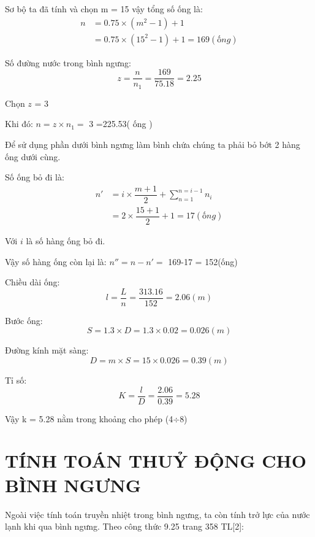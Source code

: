Sơ bộ ta đã tính và chọn m = 15 vậy tổng số ống là:
\begin{equation*}
	\begin{split}
		n &= 0.75\times (m^2 - 1) + 1\\
		&=0.75 \times (15^2-1)+1 = 169(ống)
	\end{split}
\end{equation*}

Số đường nước trong bình ngưng:
\begin{equation*}
	z = \dfrac{n}{n_{1}} = \dfrac{169}{75.18} = 2.25 
\end{equation*}

Chọn $z$ = 3

Khi đó: $n = z\times n_{1} = $ 3 =225.53( ống ) 



Để sử dụng phần dưới bình ngưng làm bình chứa chúng ta phải bỏ bớt 2 hàng ống dưới cùng.

Số ống bỏ đi là:
\begin{equation*}
	\begin{split}
		n' &= i\times \dfrac{m + 1}{2} + \sum_{n=1}^{n=i-1}n_{i}\\
		&=  2 \times \dfrac{15+1}{2}+1 = 17(ống)
	\end{split}
\end{equation*}

Với $i$ là số hàng ống bỏ đi.

Vậy số hàng ống còn lại là: $n'' = n - n' = $ 169-17 = 152(ống)

Chiều dài ống:
\begin{equation*}
	l = \dfrac{L}{n} = \dfrac{313.16}{152}= 2.06(m)
\end{equation*}

Bước ống:
\begin{equation*}
	S = 1.3\times D = 1.3 \times 0.02 = 0.026(m)
\end{equation*}

Đường kính mặt sàng:
\begin{equation*}
	D = m\times S = 15 \times 0.026 = 0.39(m)
\end{equation*}

Tỉ số:
\begin{equation*}
	K = \dfrac{l}{D} =\dfrac{2.06}{0.39}=5.28
\end{equation*}

Vậy k = 5.28 nằm trong khoảng cho phép (4$\div$8)

\section{TÍNH TOÁN THUỶ ĐỘNG CHO BÌNH NGƯNG}
Ngoài việc tính toán truyền nhiệt trong bình ngưng, ta còn tính trở lực của nước lạnh khi qua bình ngưng. Theo công thức 9.25 trang 358 TL[2]:

